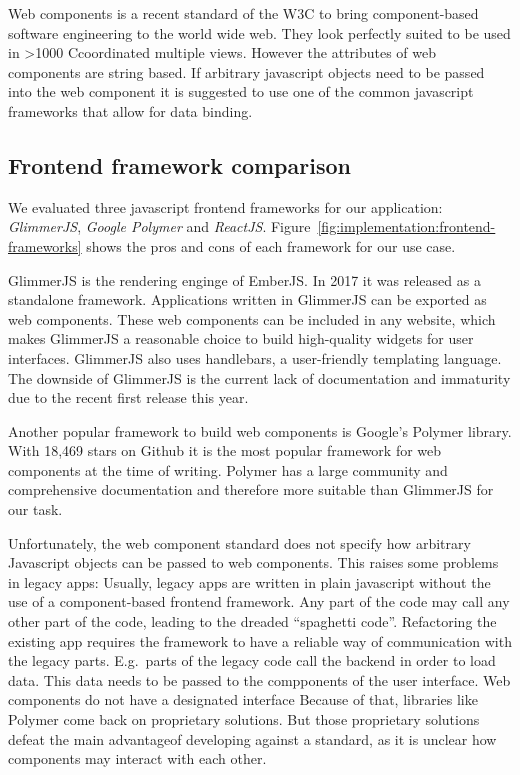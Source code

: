 \documentclass{article}
\newcommand\hmm[1]{\ifnum\ifhmode\spacefactor\else2000\fi>1000 \uppercase{#1}\else#1\fi}
\newcommand{\cmvs}{\hmm{c}oordinated multiple views}
\begin{document}
Web components is a recent standard of the W3C\cite{W3C2017} to bring component-based software engineering to the world wide web.
They look perfectly suited to be used in \cmvs{}.
However the attributes of web components are string based.
If arbitrary javascript objects need to be passed into the web component it is suggested to use one of the common javascript frameworks that allow for data binding.

\subsection{Frontend framework comparison}

We evaluated three javascript frontend frameworks for our application: \emph{GlimmerJS}, \emph{Google Polymer} and \emph{ReactJS}.
Figure~\ref{fig:implementation:frontend-frameworks} shows the pros and cons of each framework for our use case.

GlimmerJS is the rendering enginge of EmberJS\cite{Ember2017}.
In 2017 it was released as a standalone framework.
Applications written in GlimmerJS can be exported as web components.
These web components can be included in any website, which makes GlimmerJS a reasonable choice to build high-quality widgets for user interfaces.
GlimmerJS also uses handlebars\cite{Handlebars2017}, a user-friendly templating language.
The downside of GlimmerJS is the current lack of documentation and immaturity due to the recent first release this year.

Another popular framework to build web components is Google's Polymer library\cite{Polymer2017}.
With 18,469 stars on Github it is the most popular framework for web components at the time of writing.
Polymer has a large community and comprehensive documentation and therefore more suitable than GlimmerJS for our task.

Unfortunately, the web component standard does not specify how arbitrary Javascript objects can be passed to web components.
This raises some problems in legacy apps:
Usually, legacy apps are written in plain javascript without the use of a component-based frontend framework.
Any part of the code may call any other part of the code, leading to the dreaded ``spaghetti code''.
Refactoring the existing app requires the framework to have a reliable way of communication with the legacy parts.
E.g.\ parts of the legacy code call the backend in order to load data.
This data needs to be passed to the compponents of the user interface.
Web components do not have a designated interface
Because of that, libraries like Polymer come back on proprietary solutions.
But those proprietary solutions defeat the main advantageof developing against a standard, as it is unclear how components may interact with each other.
\end{document}
